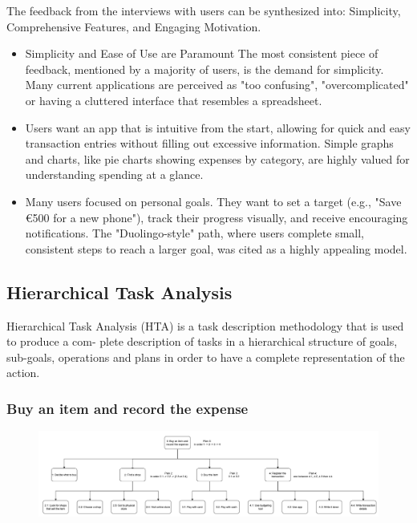 \documentclass[a4paper,12pt]{article}
\begin{document}
The feedback from the interviews with users can be synthesized into: Simplicity, Comprehensive Features, and Engaging Motivation.
\begin{itemize}
\item Simplicity and Ease of Use are Paramount
The most consistent piece of feedback, mentioned by a majority of users, is the demand for simplicity. Many current applications are perceived as "too confusing", "overcomplicated" or having a cluttered interface that resembles a spreadsheet.

\item Users want an app that is intuitive from the start, allowing for quick and easy transaction entries without filling out excessive information.
Simple graphs and charts, like pie charts showing expenses by category, are highly valued for understanding spending at a glance.
\item Many users focused on personal goals. They want to set a target (e.g., "Save €500 for a new phone"), track their progress visually, and receive encouraging notifications. The "Duolingo-style" path, where users complete small, consistent steps to reach a larger goal, was cited as a highly appealing model.
\end{itemize}
\vspace{5cm} 
\subsection{Hierarchical Task Analysis}

Hierarchical Task Analysis (HTA) is a task description methodology that is used to produce a com-
plete description of tasks in a hierarchical structure of goals, sub-goals, operations and plans in order
to have a complete representation of the action.

\subsubsection{Buy an item and record the expense}
\begin{figure}[H]
    \centering
    \includegraphics[width=\textwidth]{HTA1.png}
\end{figure}
\end{document}
